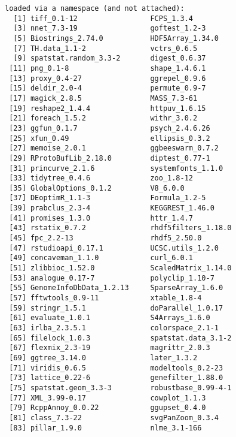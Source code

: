 \documentclass[
  letterpaper,
  DIV=11,
  numbers=noendperiod]{scrreprt}
\begin{document}
\begin{verbatim}
loaded via a namespace (and not attached):
  [1] tiff_0.1-12                 FCPS_1.3.4                 
  [3] nnet_7.3-19                 goftest_1.2-3              
  [5] Biostrings_2.74.0           HDF5Array_1.34.0           
  [7] TH.data_1.1-2               vctrs_0.6.5                
  [9] spatstat.random_3.3-2       digest_0.6.37              
 [11] png_0.1-8                   shape_1.4.6.1              
 [13] proxy_0.4-27                ggrepel_0.9.6              
 [15] deldir_2.0-4                permute_0.9-7              
 [17] magick_2.8.5                MASS_7.3-61                
 [19] reshape2_1.4.4              httpuv_1.6.15              
 [21] foreach_1.5.2               withr_3.0.2                
 [23] ggfun_0.1.7                 psych_2.4.6.26             
 [25] xfun_0.49                   ellipsis_0.3.2             
 [27] memoise_2.0.1               ggbeeswarm_0.7.2           
 [29] RProtoBufLib_2.18.0         diptest_0.77-1             
 [31] princurve_2.1.6             systemfonts_1.1.0          
 [33] tidytree_0.4.6              zoo_1.8-12                 
 [35] GlobalOptions_0.1.2         V8_6.0.0                   
 [37] DEoptimR_1.1-3              Formula_1.2-5              
 [39] prabclus_2.3-4              KEGGREST_1.46.0            
 [41] promises_1.3.0              httr_1.4.7                 
 [43] rstatix_0.7.2               rhdf5filters_1.18.0        
 [45] fpc_2.2-13                  rhdf5_2.50.0               
 [47] rstudioapi_0.17.1           UCSC.utils_1.2.0           
 [49] concaveman_1.1.0            curl_6.0.1                 
 [51] zlibbioc_1.52.0             ScaledMatrix_1.14.0        
 [53] analogue_0.17-7             polyclip_1.10-7            
 [55] GenomeInfoDbData_1.2.13     SparseArray_1.6.0          
 [57] fftwtools_0.9-11            xtable_1.8-4               
 [59] stringr_1.5.1               doParallel_1.0.17          
 [61] evaluate_1.0.1              S4Arrays_1.6.0             
 [63] irlba_2.3.5.1               colorspace_2.1-1           
 [65] filelock_1.0.3              spatstat.data_3.1-2        
 [67] flexmix_2.3-19              magrittr_2.0.3             
 [69] ggtree_3.14.0               later_1.3.2                
 [71] viridis_0.6.5               modeltools_0.2-23          
 [73] lattice_0.22-6              genefilter_1.88.0          
 [75] spatstat.geom_3.3-3         robustbase_0.99-4-1        
 [77] XML_3.99-0.17               cowplot_1.1.3              
 [79] RcppAnnoy_0.0.22            ggupset_0.4.0              
 [81] class_7.3-22                svgPanZoom_0.3.4           
 [83] pillar_1.9.0                nlme_3.1-166               

\end{verbatim}
\end{document}
